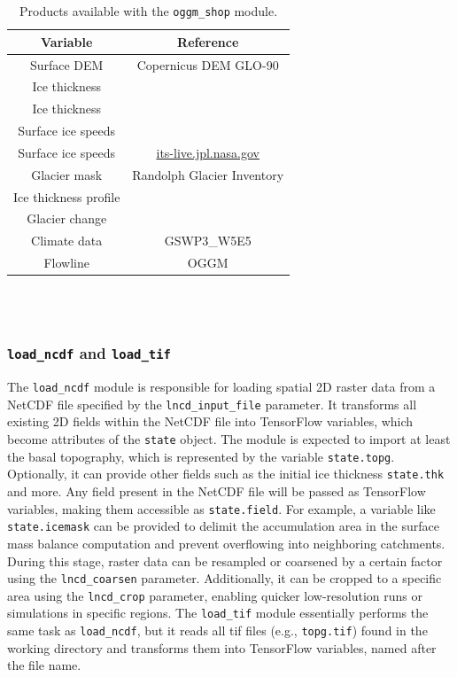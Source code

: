 \documentclass[10pt,twocolumn]{article}
\begin{document}
\begin{table}
\begin{tabular}{|c|c|}
\hline 
Variable & Reference \\ 
\hline 
Surface DEM   & Copernicus DEM GLO-90 \\ 
Ice thickness & \citep{millan2022ice} \\ 
Ice thickness & \citep{farinotti2019consensus} \\ 
Surface ice speeds & \citep{millan2022ice} \\ 
Surface ice speeds & \url{its-live.jpl.nasa.gov} \\ 
Glacier mask & Randolph Glacier Inventory  \\ 
Ice thickness profile & \citep{GlaThiDa} \\
Glacier change & \citep{hugonnet2021accelerated} \\
Climate data & GSWP3\_W5E5 \\
Flowline & OGGM \\
\hline 
\end{tabular} 
$ $ \\ $ $ \\
\caption{Products available with the \texttt{oggm\_shop} module. \label{oggm_products} }
\end{table}
 
\subsubsection{\texttt{load\_ncdf} and \texttt{load\_tif}}
\label{module_loads}

The \texttt{load\_ncdf} module is responsible for loading spatial 2D raster data from a 
NetCDF file specified by the \texttt{lncd\_input\_file} parameter. It transforms all existing 2D fields within 
the NetCDF file into TensorFlow variables, which become attributes of the \texttt{state} object.
The module is expected to import at least the basal topography, which is represented by
the variable \texttt{state.topg}. Optionally, it can provide other fields such as the 
initial ice thickness \texttt{state.thk} and more. Any field present in the NetCDF file 
will be passed as TensorFlow variables, making them accessible as \texttt{state.field}. 
For example, a variable like \texttt{state.icemask} can be provided to delimit the 
accumulation area in the surface mass balance computation and prevent overflowing 
into neighboring catchments.
During this stage, raster data can be resampled or coarsened by a certain factor using 
the \texttt{lncd\_coarsen} parameter. Additionally, it can be cropped to a specific area 
using the \texttt{lncd\_crop} parameter, enabling quicker low-resolution runs or simulations 
in specific regions.
The \texttt{load\_tif} module essentially performs the same task as \texttt{load\_ncdf}, 
but it reads all tif files (e.g., \texttt{topg.tif}) found in the working directory 
and transforms them into TensorFlow variables, named after the file name.
\end{document}
